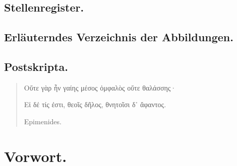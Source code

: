 \documentclass[a4paper, 11pt, oneside]{article}
\begin{document}
\subsection*{Stellenregister.}

\subsection*{Erläuterndes Verzeichnis der Abbildungen.}

\subsection*{Postskripta.}
\clearpage
\begin{quotation}
\normalsize
\begin{flushright}
Οὔτε γὰρ ἦν γαίης μέσος ὀμφαλὸς οὔτε θαλάσσης·

Εἰ δέ τίς ἐστι, θεοῖς δῆλος, θνητοῖσι δ᾽ ἄφαντος.\hspace*{1em}

Epimenides.
\end{flushright}
\end{quotation}
\section*{Vorwort.}
\end{document}
